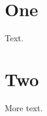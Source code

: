 \documentclass{report}
\begin{document}
\chapter{One}
Text.
\chapter{Two}
More text.
\end{document}
